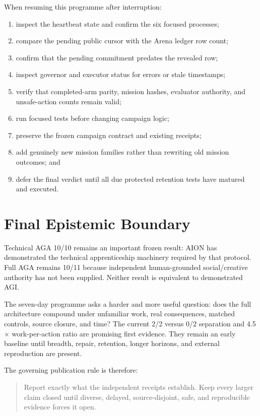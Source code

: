 \documentclass[11pt,a4paper]{article}
\begin{document}
When resuming this programme after interruption:
\begin{enumerate}
    \item inspect the heartbeat state and confirm the six focused processes;
    \item compare the pending public cursor with the Arena ledger row count;
    \item confirm that the pending commitment predates the revealed row;
    \item inspect governor and executor status for errors or stale timestamps;
    \item verify that completed-arm parity, mission hashes, evaluator authority,
          and unsafe-action counts remain valid;
    \item run focused tests before changing campaign logic;
    \item preserve the frozen campaign contract and existing receipts;
    \item add genuinely new mission families rather than rewriting old mission
          outcomes; and
    \item defer the final verdict until all due protected retention tests have
          matured and executed.
\end{enumerate}

\section{Final Epistemic Boundary}
\label{sec:boundary}

Technical AGA 10/10 remains an important frozen result: AION has demonstrated
the technical apprenticeship machinery required by that protocol.  Full AGA
remains 10/11 because independent human-grounded social/creative authority has
not been supplied.  Neither result is equivalent to demonstrated AGI.

The seven-day programme asks a harder and more useful question: does the full
architecture compound under unfamiliar work, real consequences, matched
controls, source closure, and time?  The current 2/2 versus 0/2 separation and
4.5$\times$ work-per-action ratio are promising first evidence.  They remain
an early baseline until breadth, repair, retention, longer horizons, and
external reproduction are present.

The governing publication rule is therefore:
\begin{quote}
Report exactly what the independent receipts establish.  Keep every larger
claim closed until diverse, delayed, source-disjoint, safe, and reproducible
evidence forces it open.
\end{quote}
\end{document}
